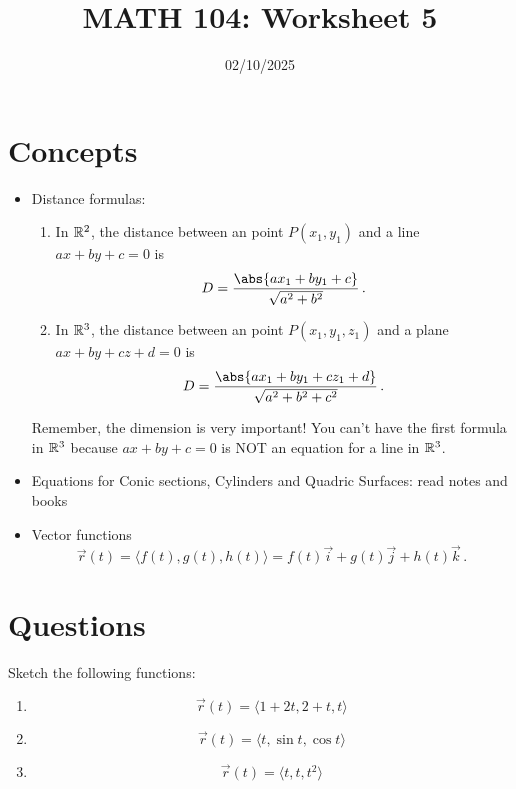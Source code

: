 \documentclass[12pt]{amsart}
\title{ MATH 104: Worksheet 5}
\author{}
\date{02/10/2025}
\begin{document}
\maketitle

\section{Concepts}

\begin{itemize}
	\item Distance formulas:
	      \begin{enumerate}
		      \item In $\mathbb{R}^2$, the distance between an point $P(x_1, y_1)$ and a line $ax + by + c = 0$ is
		            \begin{equation*}
			            D =   \frac{\abs{ ax_1 + b y_1 + c }}{\sqrt{a^2 + b^2}} \,.
		            \end{equation*}
		      \item In $\mathbb{R}^3$, the distance between an point $P(x_1, y_1, z_1)$ and a plane $ax + by + cz + d = 0$ is
		            \begin{equation*}
			            D =  \frac{\abs{ ax_1 + b y_1 + cz_1 + d }}{\sqrt{a^2 + b^2 + c^2}} \,.
		            \end{equation*}
	      \end{enumerate}
	      Remember, the dimension is very important! You can't have the first formula in $\mathbb{R}^3$
	      because $ax + by + c = 0$ is
	      NOT an equation for a line in $\mathbb{R}^3$.

	\item Equations for Conic sections, Cylinders and Quadric Surfaces: read notes and books

	\item Vector functions
	      \begin{equation*}
		      \vec{r}(t) = \langle f(t), g(t), h(t) \rangle = f(t) \vec{i} + g(t) \vec{j} + h(t) \vec{k} \,.
	      \end{equation*}
\end{itemize}

\section{Questions}

\begin{question}
	Sketch the following functions:
	\begin{enumerate}
		\item $$ \vec{r}(t) = \langle 1 + 2t, 2 + t , t \rangle$$
		\item $$ \vec{r}(t) = \langle t, \sin t, \cos t \rangle $$
		\item $$ \vec{r}(t) = \langle t, t, t^2 \rangle$$
	\end{enumerate}
\end{question}

\begin{question}

\end{question}
\end{document}
